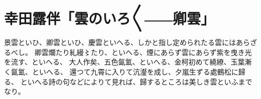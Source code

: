 \documentclass{ujarticle}
\begin{document}
\section{幸田露伴「雲のいろ〳〵――卿雲」}
景雲といひ、卿雲といひ、慶雲といへる、しかと指し定められたる雲にはあらざるべし。
卿雲爛たり糺縵〻たり、といへる、煙にあらず雲にあらず紫を曳き光を流す、といへる、
大人作矣、五色氤氳、といへる、金柯初めて繞繚、玉葉漸く氤氳、といへる、
還つて九霄に入りて沆瀣を成し、夕嵐生ずる處鶴松に歸る、
といへる詩の句などによりて見れば、歸するところは美しき雲といふまでなり。
\end{document}
